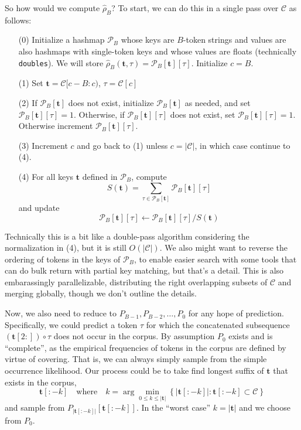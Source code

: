 \documentclass[11pt, oneside]{amsart}   	%
\begin{document}
So how would we compute $\hat{\rho}_B$? To start, we can do this in a single pass over $\mathcal{C}$ as follows: 
\begin{itemize}
	\item[(0)] Initialize a hashmap $\mathcal{P}_B$ whose keys are $B$-token strings and values are also hashmaps with single-token keys and whose values are floats (technically \texttt{doubles}). We will store $\hat{\rho}_B(\mathbf{t},\tau) = \mathcal{P}_B[\mathbf{t}][\tau]$. Initialize $c = B$. 
	\item[(1)] Set $\mathbf{t} = \mathcal{C}[c-B:c)$, $\tau = \mathcal{C}[c]$
	\item[(2)] If $\mathcal{P}_B[\mathbf{t}]$ does not exist, initialize $\mathcal{P}_B[\mathbf{t}]$ as needed, and set $\mathcal{P}_B[\mathbf{t}][\tau] = 1$. Otherwise, if $\mathcal{P}_B[\mathbf{t}][\tau]$ does not exist, set $\mathcal{P}_B[\mathbf{t}][\tau] = 1$. Otherwise increment $\mathcal{P}_B[\mathbf{t}][\tau]$. 
	\item[(3)] Increment $c$ and go back to (1) unless $c = |\mathcal{C}|$, in which case continue to (4). 
	\item[(4)] For all keys $\mathbf{t}$ defined in $\mathcal{P}_B$, compute 
	\begin{equation*}
		S(\mathbf{t}) = \sum_{\tau \in \mathcal{P}_B[\mathbf{t}]} \mathcal{P}_B[\mathbf{t}][\tau]
	\end{equation*}
	and update
	\begin{equation*}
		\mathcal{P}_B[\mathbf{t}][\tau] \leftarrow \mathcal{P}_B[\mathbf{t}][\tau] / S(\mathbf{t})
	\end{equation*}
\end{itemize}
Technically this is a bit like a double-pass algorithm considering the normalization in (4), but it is still $O(|\mathcal{C}|)$. We also might want to reverse the ordering of tokens in the keys of $\mathcal{P}_B$, to enable easier search with some tools that can do bulk return with partial key matching, but that's a detail. This is also embarassingly parallelizable, distributing the right overlapping subsets of $\mathcal{C}$ and merging globally, though we don't outline the details. 

Now, we also need to reduce to $P_{B-1}, P_{B-2}, \dotsc, P_0$ for any hope of prediction. Specifically, we could predict a token $\tau$ for which the concatenated subsequence $(\mathbf{t}[2:]) \circ \tau$ does not occur in the corpus. By assumption $P_0$ exists and is ``complete'', as the empirical frequencies of tokens in the corpus are defined by virtue of covering. That is, we can always simply sample from the simple occurrence likelihood. Our process could be to take find longest suffix of $\mathbf{t}$ that exists in the corpus, 
\begin{equation*}
	\mathbf{t}[:-k] 
	\quad\text{where}\quad 
	k = \arg \min_{0 \leq k \leq |\mathbf{t}|} \left\{ |\mathbf{t}[:-k] | : \mathbf{t}[:-k] \subset \mathcal{C} \right\}
\end{equation*}
and sample from $P_{|\mathbf{t}[:-k]|}[\mathbf{t}[:-k]]$. In the ``worst case'' $k = |\mathbf{t}|$ and we choose from $P_0$. 
\end{document}
